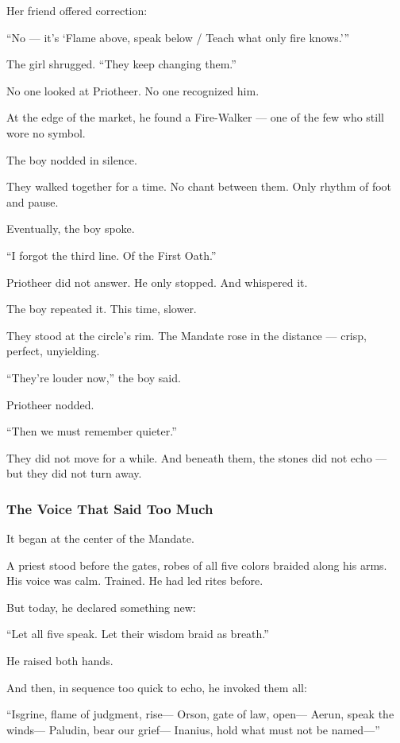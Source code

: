 \documentclass[12pt]{article}
\begin{document}
Her friend offered correction:

 “No — it’s ‘Flame above, speak below / Teach what only fire knows.’”

The girl shrugged.  
 “They keep changing them.”

No one looked at Priotheer.  
No one recognized him.

At the edge of the market, he found a Fire-Walker — one of the few who still wore no symbol.

The boy nodded in silence.

They walked together for a time.  
No chant between them.  
Only rhythm of foot and pause.

Eventually, the boy spoke.

 “I forgot the third line.  
 Of the First Oath.”

Priotheer did not answer.  
He only stopped.  
And whispered it.

The boy repeated it.  
This time, slower.

They stood at the circle’s rim.  
The Mandate rose in the distance — crisp, perfect, unyielding.

 “They’re louder now,” the boy said.

Priotheer nodded.

 “Then we must remember quieter.”

They did not move for a while.  
And beneath them, the stones did not echo —  
but they did not turn away.

\dotfill

\subsubsection{The Voice That Said Too Much}

It began at the center of the Mandate.

A priest stood before the gates,  
robes of all five colors braided along his arms.  
His voice was calm. Trained.  
He had led rites before.

But today, he declared something new:

 “Let all five speak.  
 Let their wisdom braid as breath.”

He raised both hands.

And then, in sequence too quick to echo,  
he invoked them all:

 “Isgrine, flame of judgment, rise—  
Orson, gate of law, open—  
Aerun, speak the winds—  
Paludin, bear our grief—  
Inanius, hold what must not be named—”
\end{document}

